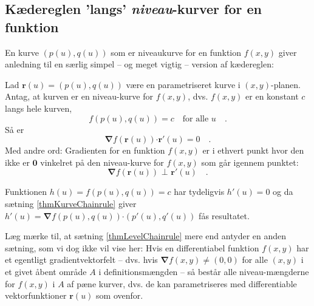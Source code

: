 
\subsection{Kædereglen 'langs' \emph{niveau}-kurver for en funktion}


En kurve  $(p(u), q(u))$ som er niveaukurve for en funktion $f(x,y)$
giver anledning til en særlig simpel -- og meget vigtig -- version af kædereglen:

\begin{theorem} \label{thmLevelChainrule}
Lad $\mathbf{r}(u) = (p(u), q(u))$ være en parametriseret kurve i $(x,y)$-planen.
Antag, at kurven er en niveau-kurve for $f(x,y)$, dvs. $f(x,y)$ er en konstant $c$ langs hele kurven,
\begin{equation}
f(p(u), q(u)) = c \quad  \textrm{for alle $u$} \quad.
\end{equation}
Så  er
\begin{equation}
{\bm{\nabla}}f(\mathbf{r}(u)) {\bm{\cdot}} \mathbf{r}'(u) = 0 \quad .
\end{equation}
Med andre ord: Gradienten for en funktion $f(x,y)$ er i ethvert punkt hvor den ikke er $\mathbf{0}$ vinkelret på den niveau-kurve for $f(x,y)$ som går igennem punktet:
\begin{equation}
{\bm{\nabla}}f(\mathbf{r}(u))\,\, \bot  \,\, \mathbf{r}'(u) \quad .
\end{equation}
\end{theorem}
\begin{bevis}
Funktionen $h(u) = f(p(u), q(u)) = c$ har tydeligvis $h'(u) = 0$ og da sætning \ref{thmKurveChainrule} giver $h'(u) = {\bm{\nabla}}f(p(u), q(u)) {\bm{\cdot}} (p'(u), q'(u) )$ fås resultatet.
\end{bevis}

\begin{aha}
Læg mærke til, at sætning \ref{thmLevelChainrule} mere end antyder en anden sætning, som vi dog ikke vil vise her:
Hvis en differentiabel funktion $f(x,y)$ har et egentligt gradientvektorfelt --
dvs. hvis ${\bm{\nabla}}f(x,y) \neq (0,0)$ for alle $(x,y)$ i et givet åbent område $A$ i definitionsmængden --  så består alle niveau-mængderne for $f(x,y)$ i $A$ af pæne kurver, dvs. de kan parametriseres med differentiable vektorfunktioner $\mathbf{r}(u)$ som ovenfor.
\end{aha}



